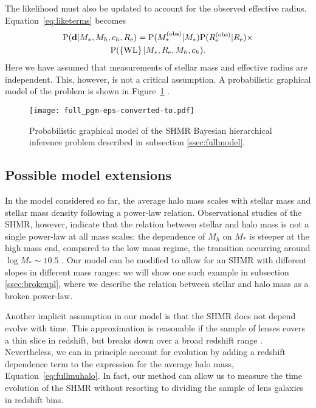 \documentclass[usenatbib]{mnras}
\def\mobs{M_*^{\mathrm{(obs)}}}
\def\mstar{M_*}
\def\mhalo{M_{h}}
\def\chalo{c_{h}}
\def\reff{R_{\mathrm{e}}}
\def\robs{\reff^{\mathrm{(obs)}}}
\def\data{\mathbf{d}}
\def\wl{\left\{\rm{WL}\right\}}
\def\Fref#1{Figure~\ref{#1}\xspace}
\def\Eref#1{Equation~\ref{#1}\xspace}
\def\pr{{\rm P}}
\begin{document}
The likelihood must also be updated to account for the observed effective radius. \Eref{eq:liketerms} becomes
\begin{multline}
\pr(\data | \mstar, \mhalo, \chalo, \reff) = \pr(\mobs | \mstar) \pr(\robs | \reff) \times \\
\pr(\wl | \mstar, \reff, \mhalo, \chalo).
\end{multline}
Here we have assumed that measurements of stellar mass and effective radius are independent. This, however, is not a critical assumption.
A probabilistic graphical model of the problem is shown in \Fref{fig:pgm2} .
%
\begin{figure}
 \texttt{[image: full\_pgm-eps-converted-to.pdf]}
 \caption{Probabilistic graphical model of the SHMR Bayesian hierarchical inference problem described in subsection \ref{ssec:fullmodel}.
}
 \label{fig:pgm2}
\end{figure}
%

\subsection{Possible model extensions}

In the model considered so far, the average halo mass scales with stellar mass and stellar mass density following a power-law relation.
Observational studies of the SHMR, however, indicate that the relation between stellar and halo mass is not a single power-law at all mass scales: the dependence of $\mhalo$ on $\mstar$ is steeper at the high mass end, compared to the low mass regime, the transition occurring around $\log{\mstar}\sim10.5$ \citep[see e.g.][]{Lea++12}.
Our model can be modified to allow for an SHMR with different slopes in different mass ranges: we will show one such example in subsection \ref{ssec:brokenpl}, where we describe the relation between stellar and halo mass as a broken power-law.

Another implicit assumption in our model is that the SHMR does not depend evolve with time. This approximation is reasonable if the sample of lenses covers a thin slice in redshift, but breaks down over a broad redshift range \citep[see e.g.][]{Mos++10}. Nevertheless, we can in principle account for evolution by adding a redshift dependence term to the expression for the average halo mass, \Eref{eq:fullmuhalo}.
In fact, our method can allow us to measure the time evolution of the SHMR without resorting to dividing the sample of lens galaxies in redshift bins.
\end{document}
